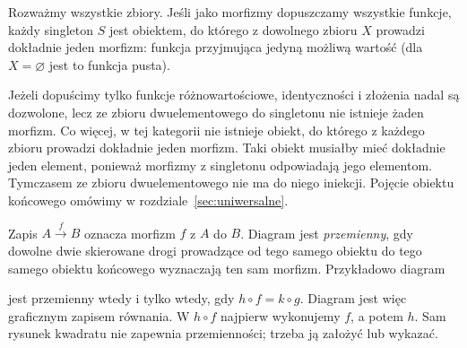 \begin{przyklad}\label{cat:ex:motywacja-morfizmy}
Rozważmy wszystkie zbiory. Jeśli jako morfizmy dopuszczamy wszystkie funkcje, każdy singleton $S$ jest obiektem, do którego z dowolnego zbioru $X$ prowadzi dokładnie jeden morfizm: funkcja przyjmująca jedyną możliwą wartość (dla $X=\varnothing$ jest to funkcja pusta).

Jeżeli dopuścimy tylko funkcje różnowartościowe, identyczności i złożenia nadal są dozwolone, lecz ze zbioru dwuelementowego do singletonu nie istnieje żaden morfizm. Co więcej, w tej kategorii nie istnieje obiekt, do którego z każdego zbioru prowadzi dokładnie jeden morfizm. Taki obiekt musiałby mieć dokładnie jeden element, ponieważ morfizmy z singletonu odpowiadają jego elementom. Tymczasem ze zbioru dwuelementowego nie ma do niego iniekcji. Pojęcie obiektu końcowego omówimy w rozdziale~\ref{sec:uniwersalne}.
\end{przyklad}

\begin{uwaga}
Zapis $A\xrightarrow{f}B$ oznacza morfizm $f$ z $A$ do $B$. Diagram jest \emph{przemienny}, gdy dowolne dwie skierowane drogi prowadzące od tego samego obiektu do tego samego obiektu końcowego wyznaczają ten sam morfizm. Przykładowo diagram
\begin{center}
\end{center}
jest przemienny wtedy i tylko wtedy, gdy $h\circ f=k\circ g$. Diagram jest więc graficznym zapisem równania. W $h\circ f$ najpierw wykonujemy $f$, a potem $h$. Sam rysunek kwadratu nie zapewnia przemienności; trzeba ją założyć lub wykazać.
\end{uwaga}

